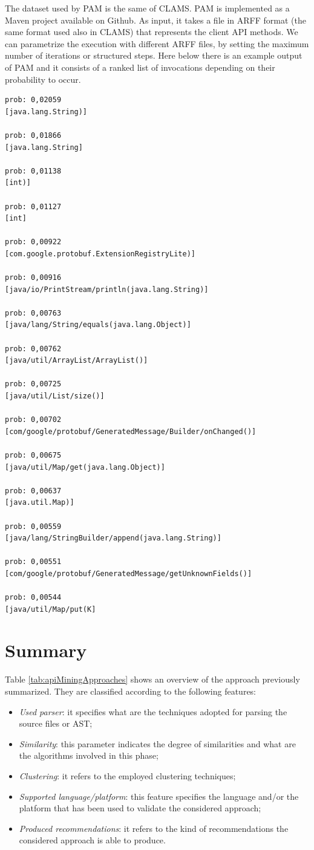 The dataset used by PAM is the same of CLAMS. PAM is implemented as a Maven 
project available on Github. As input, it takes a file in ARFF format (the same 
format used also in CLAMS) that represents the client API methods. We can 
parametrize the execution with different ARFF files, by setting the maximum 
number of iterations or structured steps. Here below there is an example output 
of PAM and it consists of a ranked list of invocations depending on their 
probability to occur. 

\begin{lstlisting}
prob: 0,02059
[java.lang.String)]

prob: 0,01866
[java.lang.String]

prob: 0,01138
[int)]

prob: 0,01127
[int]

prob: 0,00922
[com.google.protobuf.ExtensionRegistryLite)]

prob: 0,00916
[java/io/PrintStream/println(java.lang.String)]

prob: 0,00763
[java/lang/String/equals(java.lang.Object)]

prob: 0,00762
[java/util/ArrayList/ArrayList()]

prob: 0,00725
[java/util/List/size()]

prob: 0,00702
[com/google/protobuf/GeneratedMessage/Builder/onChanged()]

prob: 0,00675
[java/util/Map/get(java.lang.Object)]

prob: 0,00637
[java.util.Map)]

prob: 0,00559
[java/lang/StringBuilder/append(java.lang.String)]

prob: 0,00551
[com/google/protobuf/GeneratedMessage/getUnknownFields()]

prob: 0,00544
[java/util/Map/put(K]

\end{lstlisting}


\section{Summary}
Table \ref{tab:apiMiningApproaches} shows an overview of the approach 
previously summarized. They are classified according to the following features:
\begin{itemize}

	\item \textit{Used parser}: it specifies what are the techniques adopted 
	for parsing the source files or AST;
	\item \textit{Similarity}: this parameter indicates the degree of 
	similarities and what are the algorithms involved in this phase;
	\item \textit{Clustering}: it refers to the employed clustering techniques;
	\item \textit{Supported language/platform}: this feature specifies the 
	language and/or the platform that has been used to validate the considered 
	approach;
	\item \textit{Produced recommendations}: it refers to the kind of 
	recommendations the considered approach is able to produce.

\end{itemize} 


